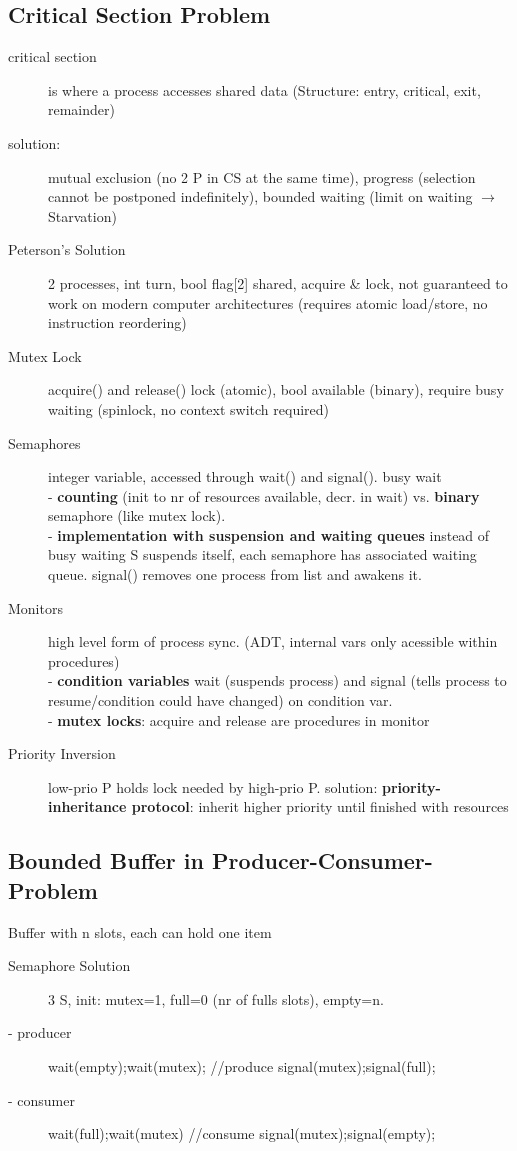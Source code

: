 \subsection*{Critical Section Problem}
\begin{description}
    \item[critical section]is where a process accesses shared data (Structure: entry, critical, exit, remainder)
    \item[solution:]mutual exclusion (no 2 P in CS at the same time), progress (selection cannot be postponed indefinitely), bounded waiting (limit on waiting $\rightarrow$ Starvation)
    \item[Peterson's Solution]2 processes, int turn, bool flag[2] shared, acquire \& lock, not guaranteed to work on modern computer architectures (requires atomic load/store, no instruction reordering)
    \item[Mutex Lock] acquire() and release() lock (atomic), bool available (binary), require busy waiting (spinlock, no context switch required)
    \item[Semaphores] integer variable, accessed through wait() and signal(). busy wait \\
        - \textbf{counting} (init to nr of resources available, decr. in wait) vs. \textbf{binary} semaphore (like mutex lock). \\
        -  \textbf{implementation with suspension and waiting queues} instead of busy waiting S suspends itself, each semaphore has associated waiting queue. signal() removes one process from list and awakens it.   %
    \item[Monitors] high level form of process sync. (ADT, internal vars only acessible within procedures) \\
        - \textbf{condition variables} wait (suspends process) and signal (tells process to resume/condition could have changed) on condition var. \\
        - \textbf{mutex locks}: acquire and release are procedures in monitor
    \item[Priority Inversion] low-prio P holds lock needed by high-prio P. solution: \textbf{priority-inheritance protocol}: inherit higher priority until finished with resources
\end{description}
\subsection*{Bounded Buffer in Producer-Consumer-Problem}
Buffer with n slots, each can hold one item
\begin{description}
    \item[Semaphore Solution]3 S, init: mutex=1, full=0 (nr of fulls slots), empty=n.
    \item[- producer]wait(empty);wait(mutex); //produce signal(mutex);signal(full);
    \item[- consumer]wait(full);wait(mutex) //consume signal(mutex);signal(empty);
\end{description}

